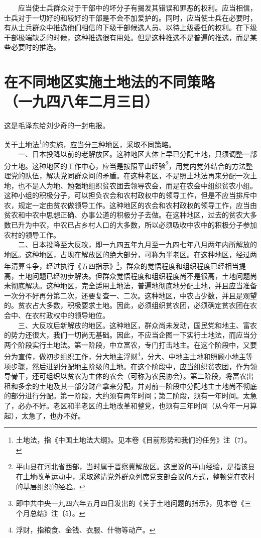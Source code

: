 \documentclass[cn,11pt,chinese]{elegantbook}
\def\myformat#1{\hfil\hfil #1}
\begin{document}
　　应当使士兵群众对于干部中的坏分子有揭发其错误和罪恶的权利。应当相信，士兵对于一切好的和较好的干部是不会不加爱护的。同时，应当使士兵在必要时，有从士兵群众中推选他们相信的下级干部候选人员、以待上级委任的权利。在下级干部极端缺乏的时候，这种推选很有用处。但是这种推选不是普遍的推选，而是某些必要时的推选。\\
\newpage\section*{\myformat{在不同地区实施土地法的不同策略}\\\myformat{（一九四八年二月三日）}}
\begin{introduction}\item  这是毛泽东给刘少奇的一封电报。\end{introduction}
关于土地法\footnote[1]{ 土地法，指《中国土地法大纲》。见本卷《目前形势和我们的任务》注〔7〕。}的实施，应当分三种地区，采取不同策略。\\
　　一、日本投降以前的老解放区。这种地区大体上早已分配土地，只须调整一部分土地。这种地区的工作中心，应当是按照平山经验\footnote[2]{ 平山县在河北省西部，当时属于晋察冀解放区。这里说的平山经验，是指该县在土地改革运动中，采取邀请党外群众列席党支部会议的方式，整顿党在农村的基层组织的经验。}，用党内党外结合的方法整理党的队伍，解决党同群众间的矛盾。在这种老区，不是照土地法再来分配一次土地，也不是人为地、勉强地组织贫农团去领导农会，而是在农会中组织贫农小组。这种小组的积极分子，可以担负农会和农村政权中的领导工作，但是不应当排斥中农，规定一定由贫农做领导工作。这种地区的农会和农村政权的领导工作，应当由贫农和中农中思想正确、办事公道的积极分子去做。在这种地区，过去的贫农大多数已升为中农，中农已占乡村人口的大多数，所以必须吸收中农中的积极分子参加农村的领导工作。\\
　　二、日本投降至大反攻，即一九四五年九月至一九四七年八月两年内所解放的地区。这种地区，占现在解放区的绝大部分，可称为半老区。在这种地区，经过两年清算斗争，经过执行《五四指示》\footnote[3]{ 即中共中央一九四六年五月四日发出的《关于土地问题的指示》，见本卷《三个月总结》注〔5〕。}，群众的觉悟程度和组织程度已经相当提高，土地问题已经初步解决。但群众觉悟程度和组织程度尚不是很高，土地问题尚未彻底解决。这种地区，完全适用土地法，普遍地彻底地分配土地，并且应当准备一次分不好再分第二次，还要复查一、二次。这种地区，中农占少数，并且是观望的。贫农占大多数，积极要求土地。因此，必须组织贫农团，必须确定贫农团在农会中、在农村政权中的领导地位。\\
　　三、大反攻后新解放的地区。这种地区，群众尚未发动，国民党和地主、富农的势力还很大，我们一切尚无基础。因此，不应当企图一下实行土地法，而应当分两个阶段实行土地法。第一阶段，中立富农，专门打击地主。在这个阶段中，又要分为宣传，做初步组织工作，分大地主浮财\footnote[4]{ 浮财，指粮食、金钱、衣服、什物等动产。}，分大、中地主土地和照顾小地主等项步骤，然后进到分配地主阶级的土地。在这个阶段中，应当组织贫农团，作为领导骨干，还可组织以贫农为主体的农会（可称为农民协会）。第二阶段，将富农出租和多余的土地及其一部分财产拿来分配，并对前一阶段中分配地主土地尚不彻底的部分进行分配。第一阶段，大约须有两年时间；第二阶段，须有一年时间。太急了，必办不好。老区和半老区的土地改革和整党，也须有三年时间（从今年一月算起），太急了，也办不好。\\
\end{document}
